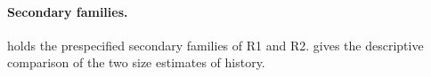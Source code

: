 

\paragraph{Secondary families.}
 holds the prespecified secondary families of R1 and R2.
 gives the descriptive comparison of the two size estimates of history.


